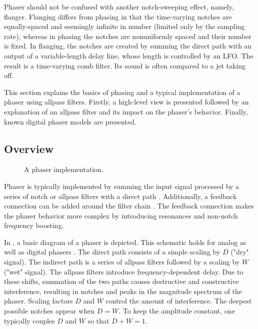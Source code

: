 Phaser should not be confused with another notch-sweeping effect, namely, flanger. Flanging differs from phasing in that the time-varying notches are equally-spaced and seemingly infinite in number (limited only by the sampling rate), whereas in phasing the notches are nonuniformly spaced and their number is fixed. In flanging, the notches are created by summing the direct path with an output of a variable-length delay line, whose length is controlled by an \ac{LFO}. The result is a time-varying comb filter. Its sound is often compared to a jet taking off.

This section explains the basics of phasing and a typical implementation of a phaser using allpass filters. Firstly, a high-level view is presented followed by an explanation of an allpass filter and its impact on the phaser's behavior. Finally, known digital phaser models are presented.

\subsection{Overview}
\label{sec:phaser_overview}

\begin{figure}
    \centering
    \vspace{2mm}
    
    \caption{A phaser implementation.}
    \label{fig:phaser}
\end{figure}

Phaser is typically implemented by summing the input signal processed by a series of notch or allpass filters with a direct path \cite{Zoelzer2011}. Additionally, a feedback connection can be added around the filter chain \cite{Kiiski2016}. The feedback connection makes the phaser behavior more complex by introducing resonances and non-notch frequency boosting.

In , a basic diagram of a phaser is depicted. This schematic holds for analog as well as digital phasers \cite{PASPWEB2010}. The direct path consists of a simple scaling by $D$ ("dry" signal). The indirect path is a series of allpass filters followed by a scaling by $W$ ("wet" signal). The allpass filters introduce frequency-dependent delay. Due to these shifts, summation of the two paths causes destructive and constructive interference, resulting in notches and peaks in the magnitude spectrum of the phaser. Scaling factors $D$ and $W$ control the amount of interference. The deepest possible notches appear when $D = W$. To keep the amplitude constant, one typically couples $D$ and $W$ so that $D + W = 1$.

